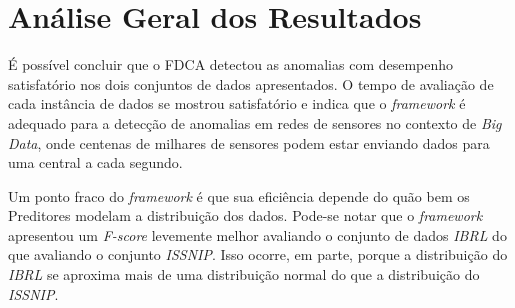 \documentclass[cic,tc]{iiufrgs}
\begin{document}
\bigskip
\begin{table}[h]
\begin{adjustwidth}{-.5in}{-.5in}
    \caption{Avaliação do FDCA com agrupamento por modelagem de mistura Gaussiana para o conjunto de dados \textit{IBRL}}
    \bigskip
    \begin{center}
    \label{av_gaussian_ibrl}
    \end{center}
\end{adjustwidth}
\end{table}

\section{Análise Geral dos Resultados}
É possível concluir que o FDCA detectou as anomalias com desempenho satisfatório nos dois conjuntos de dados apresentados. O tempo de avaliação de cada instância de dados se mostrou satisfatório e indica que o \textit{framework} é adequado para a detecção de anomalias em redes de sensores no contexto de \textit{Big Data}, onde centenas de milhares de sensores podem estar enviando dados para uma central a cada segundo.

Um ponto fraco do \textit{framework} é que sua eficiência depende do quão bem os Preditores modelam a distribuição dos dados. Pode-se notar que o \textit{framework} apresentou um \textit{F-score} levemente melhor avaliando o conjunto de dados \textit{IBRL} do que avaliando o conjunto \textit{ISSNIP}. Isso ocorre, em parte, porque a distribuição do \textit{IBRL} se aproxima mais de uma distribuição normal do que a distribuição do \textit{ISSNIP}.
\end{document}
